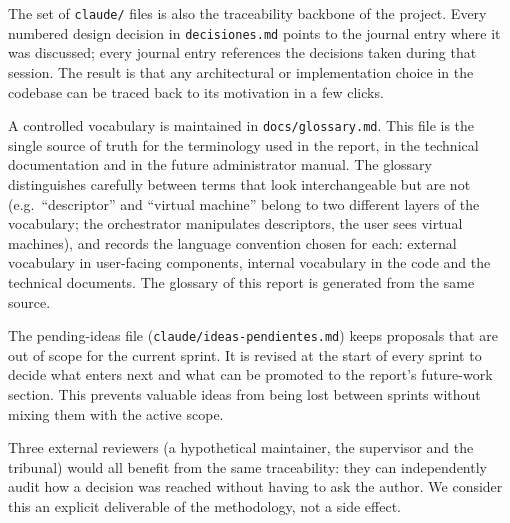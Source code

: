 The set of \texttt{claude/} files is also the traceability backbone
of the project. Every numbered design decision in
\texttt{decisiones.md} points to the journal entry where it was
discussed; every journal entry references the decisions taken
during that session. The result is that any architectural or
implementation choice in the codebase can be traced back to its
motivation in a few clicks.

A controlled vocabulary is maintained in \texttt{docs/glossary.md}.
This file is the single source of truth for the terminology used in
the report, in the technical documentation and in the future
administrator manual. The glossary distinguishes carefully between
terms that look interchangeable but are not (e.g.\ ``descriptor''
and ``virtual machine'' belong to two different layers of the
vocabulary; the orchestrator manipulates descriptors, the user
sees virtual machines), and records the language convention chosen
for each: external vocabulary in user-facing components, internal
vocabulary in the code and the technical documents. The glossary of
this report is generated from the same source.

The pending-ideas file (\texttt{claude/ideas-pendientes.md}) keeps
proposals that are out of scope for the current sprint. It is
revised at the start of every sprint to decide what enters next and
what can be promoted to the report's future-work section. This
prevents valuable ideas from being lost between sprints without
mixing them with the active scope.

Three external reviewers (a hypothetical maintainer, the supervisor
and the tribunal) would all benefit from the same traceability:
they can independently audit how a decision was reached without
having to ask the author. We consider this an explicit deliverable
of the methodology, not a side effect.
